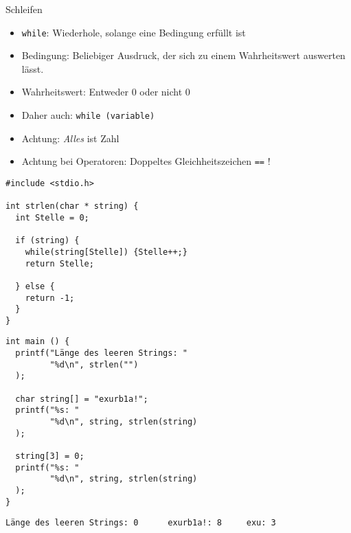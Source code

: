 
\begin{frame}[t,plain]
\titlepage
\end{frame}


\begin{frame}[fragile]{Schleifen}
%
\begin{itemize}
\item \texttt{while}: Wiederhole, solange eine Bedingung erfüllt ist
\item Bedingung: Beliebiger Ausdruck, der sich zu einem Wahrheitswert auswerten lässt.
\item Wahrheitswert: Entweder 0 oder nicht 0
\item Daher auch: \texttt{while (variable)}
\item Achtung: \emph{Alles} ist Zahl
\item Achtung bei Operatoren: Doppeltes Gleichheitszeichen \texttt{==} ! 
\end{itemize}
%
\end{frame}


\begin{frame}[fragile]
%
\begin{tcbraster}[raster columns=2, raster equal height, nobeforeafter]
%
\begin{codebox}[Beispiel: \texttt{strlen}, equal height group=A]
\begin{verbatim}
#include <stdio.h>

int strlen(char * string) {
  int Stelle = 0;
  
  if (string) {
    while(string[Stelle]) {Stelle++;}
    return Stelle;
    
  } else {
    return -1;
  }
}
\end{verbatim}
\end{codebox}
%
\begin{codebox}[...Fortsetzung, equal height group=A]
\begin{verbatim}
int main () {
  printf("Länge des leeren Strings: "
         "%d\n", strlen("")
  );
  
  char string[] = "exurb1a!";
  printf("%s: "
         "%d\n", string, strlen(string)
  );
  
  string[3] = 0;
  printf("%s: "
         "%d\n", string, strlen(string)
  );
}
\end{verbatim}
\end{codebox}
\end{tcbraster}
%
%
\begin{cmdbox}[Ausgabe]
\begin{verbatim}
Länge des leeren Strings: 0      exurb1a!: 8     exu: 3
\end{verbatim}
\end{cmdbox}
%
\end{frame}


